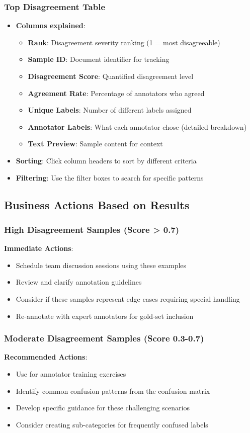 \documentclass[11pt]{article}
\begin{document}
\subsubsection{Top Disagreement Table}
\begin{itemize}
\item \textbf{Columns explained}:
\begin{itemize}
\item \textbf{Rank}: Disagreement severity ranking (1 = most disagreeable)
\item \textbf{Sample ID}: Document identifier for tracking
\item \textbf{Disagreement Score}: Quantified disagreement level
\item \textbf{Agreement Rate}: Percentage of annotators who agreed
\item \textbf{Unique Labels}: Number of different labels assigned
\item \textbf{Annotator Labels}: What each annotator chose (detailed breakdown)
\item \textbf{Text Preview}: Sample content for context
\end{itemize}
\item \textbf{Sorting}: Click column headers to sort by different criteria
\item \textbf{Filtering}: Use the filter boxes to search for specific patterns
\end{itemize}

\subsection{Business Actions Based on Results}

\subsubsection{High Disagreement Samples (Score > 0.7)}
\textbf{Immediate Actions}:
\begin{itemize}
\item Schedule team discussion sessions using these examples
\item Review and clarify annotation guidelines
\item Consider if these samples represent edge cases requiring special handling
\item Re-annotate with expert annotators for gold-set inclusion
\end{itemize}

\subsubsection{Moderate Disagreement Samples (Score 0.3-0.7)}
\textbf{Recommended Actions}:
\begin{itemize}
\item Use for annotator training exercises
\item Identify common confusion patterns from the confusion matrix
\item Develop specific guidance for these challenging scenarios
\item Consider creating sub-categories for frequently confused labels
\end{itemize}
\end{document}
